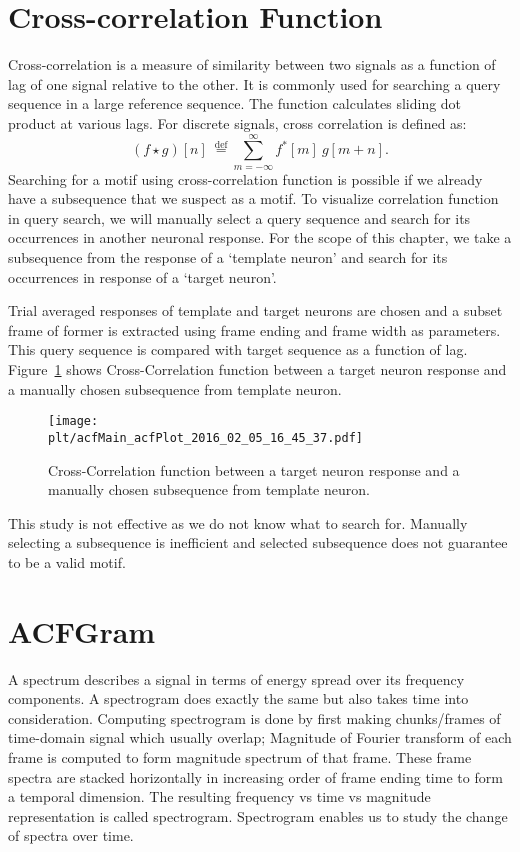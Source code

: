 \documentclass[MTech]{iitmdiss}
\newcommand{\plt}{thesis_plots}
\begin{document}
\section{Cross-correlation Function} %
\label{sec:correlation_function}
Cross-correlation is a measure of similarity between two signals as a function of lag of one signal relative to the other. It is commonly used for searching a query sequence in a large reference sequence. The function calculates sliding dot product at various lags. For discrete signals, cross correlation is defined as:
$$(f \star g)[n]\ \stackrel{\mathrm{def}}{=} \sum_{m=-\infty}^{\infty} f^*[m]\ g[m+n].$$
Searching for a motif using cross-correlation function  is possible if we already have a subsequence that we suspect as a motif. To visualize correlation function in query search, we will manually select a query sequence and search for its occurrences in another neuronal response. For the scope of this chapter, we take a subsequence from the response of a `template neuron' and search for its occurrences in response of a `target neuron'.

Trial averaged responses of template and target neurons are chosen and a subset frame of former is extracted using frame ending and frame width as parameters. This query sequence is compared with target sequence as a function of lag. Figure~\ref{img:cacf} shows Cross-Correlation function between a target neuron response and a manually chosen subsequence from template neuron.
\begin{figure}[h]
    \centering
    \texttt{[image: \\plt/acfMain\_acfPlot\_2016\_02\_05\_16\_45\_37.pdf]}
    \caption{Cross-Correlation function between a target neuron response and a manually chosen subsequence from template neuron.}
    \label{img:cacf}
\end{figure}
This study is not effective as we do not know what to search for. Manually selecting a subsequence is inefficient and selected subsequence does not guarantee to be a valid motif. 
\section{ACFGram} %
\label{sec:acfgram}
A spectrum describes a signal in terms of energy spread over its frequency components. A spectrogram does exactly the same but also takes time into consideration. Computing spectrogram is done by first making chunks/frames of time-domain signal which usually overlap; Magnitude of Fourier transform of each frame is computed to form magnitude spectrum of that frame. These frame spectra are stacked horizontally in increasing order of frame ending time to form a temporal dimension. The resulting frequency vs time vs magnitude representation is called spectrogram. Spectrogram enables us to study the change of spectra over time.
\end{document}
